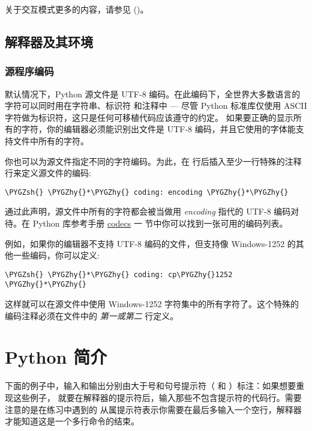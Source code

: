\documentclass[a4paper,10pt,english]{sphinxmanual}
\def\PYGZsh{\char`\#}
\def\PYGZhy{\char`\-}
\begin{document}
关于交互模式更多的内容，请参见 {\hyperref[appendix:tut-interac]{\emph{}}} ()。


\section{解释器及其环境}
\label{interpreter:tut-interp}\label{interpreter:id5}

\subsection{源程序编码}
\label{interpreter:id6}\label{interpreter:tut-source-encoding}
默认情况下，Python 源文件是 UTF-8 编码。在此编码下，全世界大多数语言的字符可以同时用在字符串、标识符
和注释中 --- 尽管 Python 标准库仅使用 ASCII 字符做为标识符，这只是任何可移植代码应该遵守的约定。
如果要正确的显示所有的字符，你的编辑器必须能识别出文件是 UTF-8 编码，并且它使用的字体能支持文件中所有的字符。

你也可以为源文件指定不同的字符编码。为此，在 \code{\#!} 行后插入至少一行特殊的注释行来定义源文件的编码:

\begin{Verbatim}[commandchars=\\\{\}]
\PYGZsh{} \PYGZhy{}*\PYGZhy{} coding: encoding \PYGZhy{}*\PYGZhy{}
\end{Verbatim}

通过此声明，源文件中所有的字符都会被当做用 \emph{encoding} 指代的 UTF-8 编码对待。在 Python 库参考手册 \href{https://docs.python.org/3/library/codecs.html\#module-codecs}{codecs} 一
节中你可以找到一张可用的编码列表。

例如，如果你的编辑器不支持 UTF-8 编码的文件，但支持像 Windows-1252 的其他一些编码，你可以定义:

\begin{Verbatim}[commandchars=\\\{\}]
\PYGZsh{} \PYGZhy{}*\PYGZhy{} coding: cp\PYGZhy{}1252 \PYGZhy{}*\PYGZhy{}
\end{Verbatim}

这样就可以在源文件中使用 Windows-1252 字符集中的所有字符了。这个特殊的编码注释必须在文件中的 \emph{第一或第二} 行定义。


\chapter{Python 简介}
\label{introduction:python}\label{introduction:codecs}\label{introduction::doc}\label{introduction:tut-informal}
下面的例子中，输入和输出分别由大于号和句号提示符（ \code{\textgreater{}\textgreater{}\textgreater{}} 和  ）标注：如果想要重现这些例子，
就要在解释器的提示符后，输入那些不包含提示符的代码行。需要注意的是在练习中遇到的
从属提示符表示你需要在最后多输入一个空行，解释器才能知道这是一个多行命令的结束。
\end{document}
